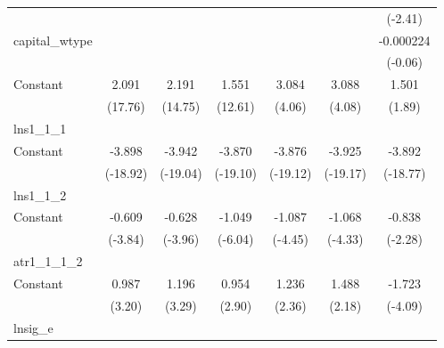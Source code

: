 {\begin{tabular}{l*{6}{c}}
                &                  &                  &                  &                  &                  &  (-2.41)         \\
capital\_wtype   &                  &                  &                  &                  &                  &-0.000224         \\
                &                  &                  &                  &                  &                  &  (-0.06)         \\
Constant        &    2.091\sym{***}&    2.191\sym{***}&    1.551\sym{***}&    3.084\sym{***}&    3.088\sym{***}&    1.501         \\
                &  (17.76)         &  (14.75)         &  (12.61)         &   (4.06)         &   (4.08)         &   (1.89)         \\
\hline
lns1\_1\_1        &                  &                  &                  &                  &                  &                  \\
Constant        &   -3.898\sym{***}&   -3.942\sym{***}&   -3.870\sym{***}&   -3.876\sym{***}&   -3.925\sym{***}&   -3.892\sym{***}\\
                & (-18.92)         & (-19.04)         & (-19.10)         & (-19.12)         & (-19.17)         & (-18.77)         \\
\hline
lns1\_1\_2        &                  &                  &                  &                  &                  &                  \\
Constant        &   -0.609\sym{***}&   -0.628\sym{***}&   -1.049\sym{***}&   -1.087\sym{***}&   -1.068\sym{***}&   -0.838\sym{*}  \\
                &  (-3.84)         &  (-3.96)         &  (-6.04)         &  (-4.45)         &  (-4.33)         &  (-2.28)         \\
\hline
atr1\_1\_1\_2      &                  &                  &                  &                  &                  &                  \\
Constant        &    0.987\sym{**} &    1.196\sym{***}&    0.954\sym{**} &    1.236\sym{*}  &    1.488\sym{*}  &   -1.723\sym{***}\\
                &   (3.20)         &   (3.29)         &   (2.90)         &   (2.36)         &   (2.18)         &  (-4.09)         \\
\hline
lnsig\_e         &                  &                  &                  &                  &                  &                  \\

\end{tabular}}
